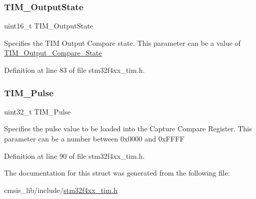\subsubsection{\texorpdfstring{T\+I\+M\+\_\+\+Output\+State}{TIM\_OutputState}}
{\footnotesize\ttfamily uint16\+\_\+t T\+I\+M\+\_\+\+Output\+State}

Specifies the T\+IM Output Compare state. This parameter can be a value of \hyperlink{group___t_i_m___output___compare___state}{T\+I\+M\+\_\+\+Output\+\_\+\+Compare\+\_\+\+State} 

Definition at line 83 of file stm32f4xx\+\_\+tim.\+h.

\mbox{\label{struct_t_i_m___o_c_init_type_def_afd7020848ac0ad264aa3c4687f3c3ec4}} 
\subsubsection{\texorpdfstring{T\+I\+M\+\_\+\+Pulse}{TIM\_Pulse}}
{\footnotesize\ttfamily uint32\+\_\+t T\+I\+M\+\_\+\+Pulse}

Specifies the pulse value to be loaded into the Capture Compare Register. This parameter can be a number between 0x0000 and 0x\+F\+F\+FF 

Definition at line 90 of file stm32f4xx\+\_\+tim.\+h.



The documentation for this struct was generated from the following file\+:\begin{DoxyCompactItemize}
\item 
cmsis\+\_\+lib/include/\hyperlink{stm32f4xx__tim_8h}{stm32f4xx\+\_\+tim.\+h}\end{DoxyCompactItemize}
